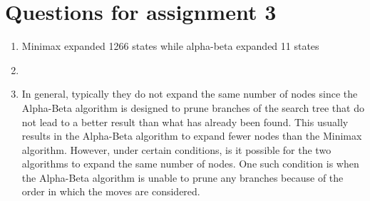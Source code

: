 \documentclass[8pt, letterpaper, titlepage]{article}
\title{\textbf{\Huge{ 
\begin{center}
MATE 201\\ \large{Class notes} %
\end{center} 
}}}
\author{Lora Ma}
\begin{document}
\section*{Questions for assignment 3}

\begin{enumerate}
  \item Minimax expanded 1266 states while alpha-beta expanded 11 states
  \item 
  \item In general, typically they do not expand the same number of nodes since the Alpha-Beta algorithm is designed to prune branches of the search tree that do not lead to a better result than what has already been found. This usually results in the Alpha-Beta algorithm to expand fewer nodes than the Minimax algorithm. However, under certain conditions, is it possible for the two algorithms to expand the same number of nodes. One such condition is when the Alpha-Beta algorithm is unable to prune any branches because of the order in which the moves are considered.
\end{enumerate}
\end{document}
